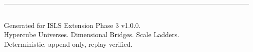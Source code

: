 \documentclass[11pt,a4paper,twoside]{article}
\theoremstyle{definition}
\theoremstyle{plain}
\theoremstyle{remark}
\newcommand{\ISLS}{\textsf{ISLS}}
\begin{document}
\vfill
\begin{center}
\rule{0.5\textwidth}{0.4pt}\\[0.5cm]
{\small Generated for \ISLS{} Extension Phase 3 v1.0.0.\\
Hypercube Universes. Dimensional Bridges. Scale Ladders.\\
Deterministic, append-only, replay-verified.}
\end{center}
\end{document}
